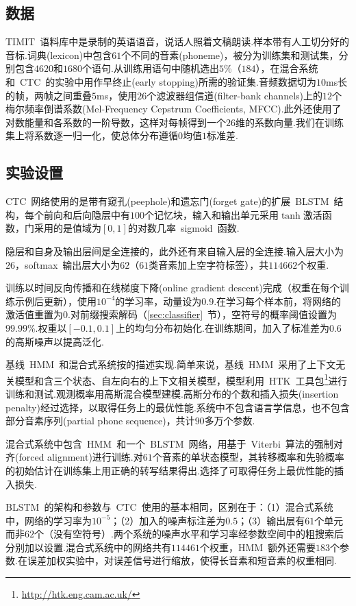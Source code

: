 \documentclass{ctexart}
\begin{document}
\subsection{数据}
TIMIT~语料库中是录制的英语语音，说话人照着文稿朗读.样本带有人工切分好的音标.词典(lexicon)中包含$61$个不同的音素(phoneme)，被分为训练集和测试集，分别包含$4620$和$1680$个语句.从训练用语句中随机选出$5$\%（$184$），在混合系统和~CTC~的实验中用作早终止(early stopping)所需的验证集.音频数据切为$10$ms长的帧，两帧之间重叠$5$ms，使用$26$个滤波器组信道(filter-bank channels)上的$12$个梅尔频率倒谱系数(Mel-Frequency Cepstrum Coefficients, MFCC).此外还使用了对数能量和各系数的一阶导数，这样对每帧得到一个$26$维的系数向量.我们在训练集上将系数逐一归一化，使总体分布遵循$0$均值$1$标准差.
\subsection{实验设置}
CTC~网络使用的是带有窥孔(peephole)和遗忘门(forget gate)的扩展~BLSTM~结构\citep{gers2003learning}，每个前向和后向隐层中有$100$个记忆块，输入和输出单元采用$\tanh$激活函数，门采用的是值域为$[0,1]$的对数几率~sigmoid~函数.

隐层和自身及输出层间是全连接的，此外还有来自输入层的全连接.输入层大小为$26$，softmax~输出层大小为$62$（$61$类音素加上空字符标签），共$114662$个权重.

训练以时间反向传播和在线梯度下降(online gradient descent)完成（权重在每个训练示例后更新），使用$10^{-4}$的学习率，动量设为$0.9$.在学习每个样本前，将网络的激活值重置为$0$.对前缀搜索解码（\ref{sec:classifier}~节），空符号的概率阈值设置为$99.99$\%.权重以$[-0.1,0.1]$上的均匀分布初始化.在训练期间，加入了标准差为$0.6$的高斯噪声以提高泛化.

基线~HMM~和混合式系统按\citep{graves2005framewise}的描述实现.简单来说，基线~HMM~采用了上下文无关模型和含三个状态、自左向右的上下文相关模型，模型利用~HTK~工具包\footnote{\url{http://htk.eng.cam.ac.uk/}}进行训练和测试.观测概率用高斯混合模型建模.高斯分布的个数和插入损失(insertion penalty)经过选择，以取得任务上的最优性能.系统中不包含语言学信息，也不包含部分音素序列(partial phone sequence)，共计$90$多万个参数.

混合式系统中包含~HMM~和一个~BLSTM~网络，用基于~Viterbi~算法的强制对齐(forced alignment)进行训练\citep{robinson1994an}.对$61$个音素的单状态模型，其转移概率和先验概率的初始估计在训练集上用正确的转写结果得出.选择了可取得任务上最优性能的插入损失.

BLSTM~的架构和参数与~CTC~使用的基本相同，区别在于：（1）混合式系统中，网络的学习率为$10^{-5}$；（2）加入的噪声标注差为$0.5$；（3）输出层有$61$个单元而非$62$个（没有空符号）.两个系统的噪声水平和学习率经参数空间中的粗搜索后分别加以设置.混合式系统中的网络共有$114461$个权重，HMM~额外还需要$183$个参数.在误差加权实验中，对误差信号进行缩放，使得长音素和短音素的权重相同\citep{robinson1991several}.
\end{document}
